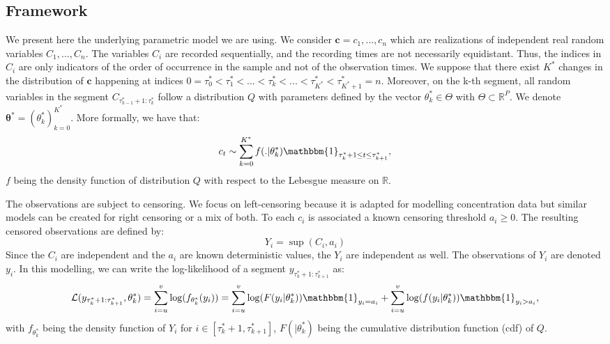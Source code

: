 \subsection{Framework}

We present here the underlying parametric model we are using. We consider $\bm c = c_1,\dots,c_n$ which are realizations of independent real random variables $C_1,\dots,C_n$. The variables $C_i$ are recorded sequentially, and the recording times are not necessarily equidistant. Thus, the indices in $C_i$ are only indicators of the order of occurrence in the sample and not of the observation times. We suppose that there exist $K^*$ changes in the distribution of $\bm c$ happening at indices $0=\tau_0^*<\tau^*_1 <... < \tau^*_k <... < \tau^*_{K^*}<\tau^*_{K^*+1}=n$. Moreover, on the k-th segment, all random variables in the segment $C_{\tau^*_{k-1}+1:\tau^*_{k}}$ follow a distribution $Q$ with parameters defined by the vector $\theta^*_k\in\Theta$ with $\Theta\subset\mathbb{R}^P$. We denote $\bm{\theta^*} = (\theta^*_k)_{k=0}^{K^*}$. More formally, we have that:  
$$c_t \sim \sum_{k=0}^{K^*} f(.\vert\theta^*_k)\mathbbm{1}_{\tau^*_{k}+1\leq t \leq \tau^*_{k+1}},$$
$f$ being the density function of distribution $Q$ with respect to the Lebesgue measure on $\mathbb{R}$.  


The observations are subject to censoring. We focus on left-censoring because it is adapted for modelling concentration data but similar models can be created for right censoring or a mix of both. To each $c_i$ is associated a known censoring threshold $a_i \ge 0$. The resulting censored observations are defined by:  
\begin{equation}\label{chp:4:defy}
Y_i = \sup(C_i,a_i)
\end{equation}
Since the $C_i$ are independent and the $a_i$ are known deterministic values, the $Y_i$ are independent as well. The observations of $Y_i$ are denoted $y_i$. In this modelling, we can write the log-likelihood of a segment $y_{\tau^*_k+1:\tau^*_{k+1}}$ as:  
\begin{equation}\label{chp:4:loglik}
\mathcal{L}(y_{\tau^*_k+1:\tau^*_{k+1}},\theta^*_k) = \sum_{i = u}^v\log(f_{\theta^*_k}(y_i)) = \sum_{i = u}^v\log(F(y_i\vert\theta^*_k))\mathbbm{1}_{y_i=a_i}+\sum_{i = u}^v\log(f(y_i \vert\theta^*_k))\mathbbm{1}_{y_i>a_i},
\end{equation}
with $f_{\theta^*_k}$ being the density function of $Y_i$ for $i \in [\tau^*_k+1,\tau^*_{k+1}]$, $F(\vert\theta^*_k)$ being the cumulative distribution function (cdf) of $Q$. 

